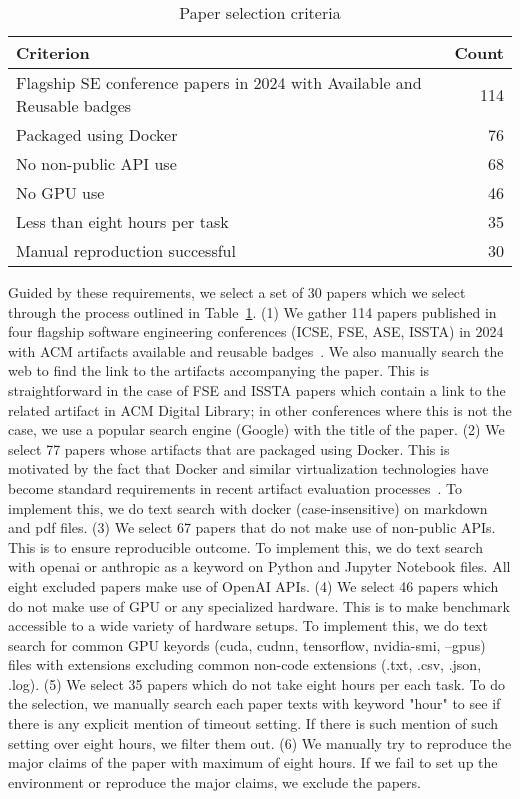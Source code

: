 \begin{table}[t]
  \caption{Paper selection criteria}
  \label{t:paper_select}
  \centering
  \begin{tabular}{@{}l r@{}}
    \toprule
    Criterion & Count \\
    \midrule
    Flagship SE conference papers in 2024 with Available and Reusable badges & 114 \\
    Packaged using Docker & 76 \\
    No non-public API use & 68 \\
    No GPU use & 46 \\
    Less than eight hours per task & 35 \\
    Manual reproduction successful & 30 \\
    \bottomrule
  \end{tabular}
\end{table}

Guided by these requirements, we select a set of 30 papers which we select through the process outlined in Table~\ref{t:paper_select}.
(1) We gather 114 papers published in four flagship software engineering conferences (ICSE, FSE, ASE, ISSTA) in 2024 with ACM artifacts available and reusable badges~\cite{acm-artifact-badging-v1_1}.
We also manually search the web to find the link to the artifacts accompanying the paper.
This is straightforward in the case of FSE and ISSTA papers which contain a link to the related artifact in ACM Digital Library; in other conferences where this is not the case, we use a popular search engine (Google) with the title of the paper.
(2) We select 77 papers whose artifacts that are packaged using Docker.
This is motivated by the fact that Docker and similar virtualization technologies
have become standard requirements in recent artifact evaluation processes~\cite{icse2024-ae,fse2024-ae,ase2024-ae}.
To implement this, we do text search with docker (case-insensitive) on markdown and pdf files.
(3) We select 67 papers that do not make use of non-public APIs.
This is to ensure reproducible outcome.
To implement this, we do text search with openai or anthropic as a keyword on Python and Jupyter Notebook files.
All eight excluded papers make use of OpenAI APIs.
(4) We select 46 papers which do not make use of GPU or any specialized hardware.
This is to make benchmark accessible to a wide variety of hardware setups.
To implement this, we do text search for common GPU keyords (cuda, cudnn, tensorflow, nvidia-smi, --gpus) files with extensions excluding common non-code extensions (.txt, .csv, .json, .log).
(5) We select 35 papers which do not take eight hours per each task.
To do the selection, we manually search each paper texts with keyword "hour" to see if there is any explicit mention of timeout setting.
If there is such mention of such setting over eight hours, we filter them out.
(6) We manually try to reproduce the major claims of the paper with maximum of eight hours.
If we fail to set up the environment or reproduce the major claims, we exclude the papers.

